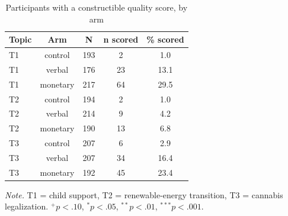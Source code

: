 \begin{table}[htbp]
\centering
\begin{threeparttable}
\caption{Participants with a constructible quality score, by arm}
\label{tab:tab_q_level_scored_by_arm}
\begin{tabular}{lcccc}
\toprule
  Topic & Arm & N & n scored & \% scored \\
\midrule
  T1 & control & 193 & 2 & 1.0 \\
  T1 & verbal & 176 & 23 & 13.1 \\
  T1 & monetary & 217 & 64 & 29.5 \\
  T2 & control & 194 & 2 & 1.0 \\
  T2 & verbal & 214 & 9 & 4.2 \\
  T2 & monetary & 190 & 13 & 6.8 \\
  T3 & control & 207 & 6 & 2.9 \\
  T3 & verbal & 207 & 34 & 16.4 \\
  T3 & monetary & 192 & 45 & 23.4 \\
\bottomrule
\end{tabular}
\begin{tablenotes}\footnotesize\item \textit{Note.} T1 = child support, T2 = renewable-energy transition, T3 = cannabis legalization. $^{+}p<.10$, $^{*}p<.05$, $^{**}p<.01$, $^{***}p<.001$.\end{tablenotes}
\end{threeparttable}
\end{table}
